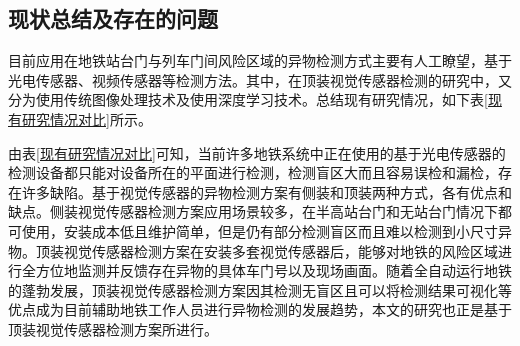 \subsection{现状总结及存在的问题}
目前应用在地铁站台门与列车门间风险区域的异物检测方式主要有人工瞭望，基于光电传感器、视频传感器等检测方法。其中，在顶装视觉传感器检测的研究中，又分为使用传统图像处理技术及使用深度学习技术。总结现有研究情况，如下表\ref{现有研究情况对比}所示。
\begin{table}[htbp]
	\centering
	\caption{现有研究情况对比}
	\label{现有研究情况对比}%
\end{table}%

由表\ref{现有研究情况对比}可知，当前许多地铁系统中正在使用的基于光电传感器的检测设备都只能对设备所在的平面进行检测，检测盲区大而且容易误检和漏检，存在许多缺陷。基于视觉传感器的异物检测方案有侧装和顶装两种方式，各有优点和缺点。侧装视觉传感器检测方案应用场景较多，在半高站台门和无站台门情况下都可使用，安装成本低且维护简单，但是仍有部分检测盲区而且难以检测到小尺寸异物。顶装视觉传感器检测方案在安装多套视觉传感器后，能够对地铁的风险区域进行全方位地监测并反馈存在异物的具体车门号以及现场画面。随着全自动运行地铁的蓬勃发展，顶装视觉传感器检测方案因其检测无盲区且可以将检测结果可视化等优点成为目前辅助地铁工作人员进行异物检测的发展趋势，本文的研究也正是基于顶装视觉传感器检测方案所进行。

